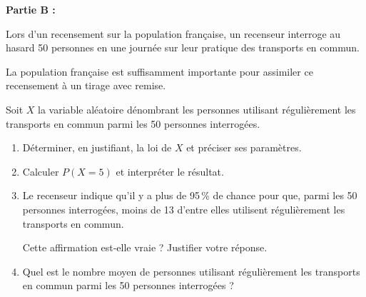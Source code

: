 \medskip

\textbf{Partie B :}

\medskip

Lors d’un recensement sur la population française, un recenseur interroge au hasard 50 personnes en une journée sur leur pratique des transports en commun.

La population française est suffisamment importante pour assimiler ce recensement
à un tirage avec remise.

\smallskip

Soit $X$ la variable aléatoire dénombrant les personnes utilisant régulièrement les transports en commun parmi les 50 personnes interrogées.

\begin{enumerate}
	\item Déterminer, en justifiant, la loi de $X$ et préciser ses paramètres.
	\item Calculer $P(X=5)$ et interpréter le résultat.
	\item Le recenseur indique qu’il y a plus de 95\,\% de chance pour que, parmi les 50 personnes interrogées, moins de 13 d’entre elles utilisent régulièrement les transports en commun.
	
	Cette affirmation est-elle vraie ? Justifier votre réponse.
	\item Quel est le nombre moyen de personnes utilisant régulièrement les transports en commun parmi les 50 personnes interrogées ?
\end{enumerate}

